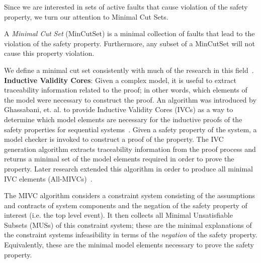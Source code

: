 Since we are interested in sets of active faults that cause violation of the safety property, we turn our attention to Minimal Cut Sets. 
\begin{definition}
A \textit{Minimal Cut Set} (MinCutSet) is a minimal collection of faults that lead to the violation of the safety property. Furthermore, any subset of a MinCutSet will not cause this property violation. 
\end{definition}
We define a minimal cut set consistently with much of the research in this field~\cite{0f356f05e72f43018211b36f97c8854a,historyFTA}.\\

\textbf{Inductive Validity Cores}: Given a complex model, it is useful to extract traceability information related to the proof; in other words, which elements of the model were necessary to construct the proof. An algorithm was introduced by Ghassabani, et. al. to provide Inductive Validity Cores (IVCs) as a way to determine which model elements are necessary for the inductive proofs of the safety properties for sequential systems~\cite{GhassabaniGW16}. Given a safety property of the system, a model checker is invoked to construct a proof of the property. The IVC generation algorithm extracts traceability information from the proof process and returns a minimal set of the model elements required in order to prove the property. Later research extended this algorithm in order to produce all minimal IVC elements (All-MIVCs)~\cite{Ghassabani2017EfficientGO,bendik2018online}. 

The MIVC algorithm considers a constraint system consisting of the assumptions and contracts of system components and the negation of the safety property of interest (i.e. the top level event). It then collects all Minimal Unsatisfiable Subsets (MUSs) of this constraint system; these are the minimal explanations of the constraint systems infeasibility in terms of the \textit{negation} of the safety property. Equivalently, these are the minimal model elements necessary to prove the safety property.%





